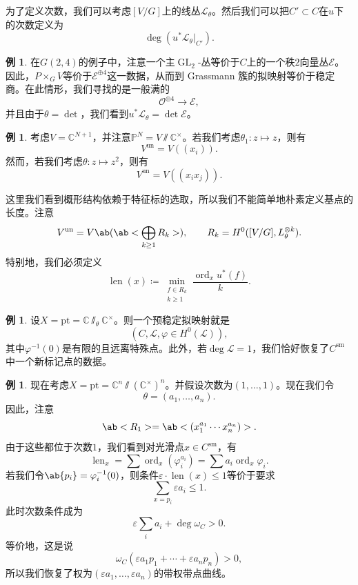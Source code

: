 \documentclass{amsart}
\theoremstyle{definition}
\newtheorem{exm}[thm]{例}
\theoremstyle{remark}
\theoremstyle{plain}
\theoremstyle{definition}
\theoremstyle{remark}
\newcommand{\C}{\mathbb{C}}
\renewcommand{\P}{\mathbb{P}}
\newcommand{\ep}{\varepsilon}
\newcommand{\mc}[1]{\mathcal{#1}}
\newcommand{\mr}[1]{\mathrm{#1}}
\newcommand{\on}[1]{\operatorname{#1}}
\newcommand{\1}{\mathbf{1}}
\newcommand{\2}{\mathbf{2}}
\newcommand{\3}{\mathbf{3}}
\begin{document}
为了定义次数，我们可以考虑\([V/G]\)上的线丛\(\mc{L}_{\theta}\)。然后我们可以把\(C' \subset C\)在\(u\)下的次数定义为
\[ \deg (u^* \mc{L}_{\theta}|_{C'}). \]

\begin{exm}
    在\(G(2,4)\)的例子中，注意一个主\(\on{GL}_2\)-丛等价于\(C\)上的一个秩\(2\)向量丛\(\mc{E}\)。因此，\(P \times_G V\)等价于\(\mc{E}^{\oplus 4}\)这一数据，从而到 Grassmann 簇的拟映射等价于稳定商。在此情形，我们寻找的是一般满的
    \[ \mc{O}^{\oplus 4} \to \mc{E}, \]
    并且由于\(\theta = \det\)，我们看到\(u^* \mc{L}_{\theta} = \det \mc{E}\)。
\end{exm}

\begin{exm}
    考虑\(V = \C^{N+1}\)，并注意\(\P^N = V \sslash \C^{\times}\)。若我们考虑\(\theta_1 \colon z \mapsto z\)，则有
    \[ V^{\on{un}} = V((x_i)). \]
    然而，若我们考虑\(\theta \colon z \mapsto z^2\)，则有
    \[ V^{\on{un}} = V((x_i x_j)). \]
\end{exm}

这里我们看到概形结构依赖于特征标的选取，所以我们不能简单地朴素定义基点的长度。注意
\[ V^{\on{un}} = V\ab(\ab< \bigoplus_{k \geq 1} R_k>), \qquad R_k = H^0([V/G], L_{\theta}^{\otimes k}). \]
特别地，我们必须定义
\[ \on{len}(x) \coloneqq \min_{\substack{f \in R_k \\ k \geq 1}} \frac{\on{ord}_x u^*(f)}{k}. \]

\begin{exm}
    设\(X = \mr{pt} = \C \sslash_{\theta} \C^{\times}\)。则一个预稳定拟映射就是
    \[ (C, \mc{L}, \varphi \in H^0(\mc{L})), \]
    其中\(\varphi^{-1}(0)\)是有限的且远离特殊点。此外，若\(\deg \mc{L} = 1\)，我们恰好恢复了\(C^{\mr{sm}}\)中一个新标记点的数据。
\end{exm}

\begin{exm}
    现在考虑\(X = \mr{pt} = \C^n \sslash (\C^{\times})^n\)。并假设次数为\((1, \ldots, 1)\)。现在我们令
    \[ \theta = (a_1, \ldots, a_n). \]
    因此，注意
    \[ \ab<R_1> = \ab<(x_1^{a_1} \cdots x_n^{a_n})>. \]
    由于这些都位于次数\(1\)，我们看到对光滑点\(x \in C^{\mr{sm}}\)，有
    \[ \on{len}_x = \sum \on{ord}_x (\varphi_i^{a_i}) = \sum a_i \on{ord}_x \varphi_i. \]
    若我们令\(\ab\{p_i\} = \varphi_i^{-1}(0)\)，则条件\(\ep \cdot \on{len}(x) \leq 1\)等价于要求
    \[ \sum_{x = p_i} \ep a_i \leq 1. \]
    此时次数条件成为
    \[ \ep \sum_i a_i + \deg \omega_C > 0. \]
    等价地，这是说
    \[ \omega_C(\ep a_1 p_1 + \cdots + \ep a_n p_n) > 0, \]
    所以我们恢复了权为\((\ep a_1, \ldots, \ep a_n)\)的带权带点曲线。
\end{exm}
\end{document}
